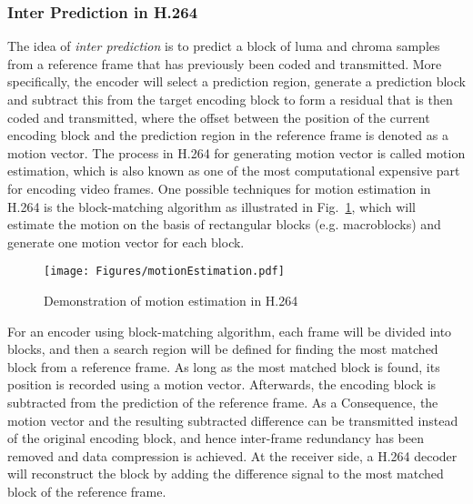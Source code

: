 \subsubsection{Inter Prediction in H.264}
\label{sec::MEIntro}
%
The idea of \emph{inter prediction} is to predict a block of luma and chroma samples from a reference frame that has previously been coded and transmitted.
More specifically, the encoder will select a prediction region, generate a prediction block and subtract this from the target encoding block to form a residual that is then coded and transmitted, where the offset between the position of the current encoding block and the prediction region in the reference frame is denoted as a motion vector.
The process in H.264 for generating motion vector is called motion estimation, which is also known as one of the most computational expensive part for encoding video frames.
One possible techniques for motion estimation in H.264 is the block-matching algorithm as illustrated in Fig.~\ref{fig::MEIntro}, which will estimate the motion on the basis of rectangular blocks (e.g. macroblocks) and generate one motion vector for each block.
%
\begin{figure}
\begin{center}
\texttt{[image: Figures/motionEstimation.pdf]}
\caption{\label{fig::MEIntro}Demonstration of motion estimation in H.264}
\end{center}
\end{figure}
%

For an encoder using block-matching algorithm, each frame will be divided into blocks, and then a search region will be defined for finding the most matched block from a reference frame.
As long as the most matched block is found, its position is recorded using a motion vector.
Afterwards, the encoding block is subtracted from the prediction of the reference frame.
As a Consequence, the motion vector and the resulting subtracted difference can be transmitted instead of the original encoding block, and hence inter-frame redundancy has been removed and data compression is achieved.
At the receiver side, a H.264 decoder will reconstruct the block by adding the difference signal to the most matched block of the reference frame.